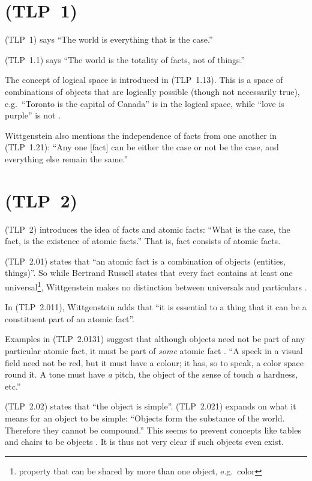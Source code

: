 \documentclass{article}
\newcommand{\prop}[1]{(TLP~#1)}
\begin{document}
\section*{\prop{1}}

\prop{1} says ``The world is everything that is the case.''

\prop{1.1} says ``The world is the totality of facts, not of things.''

The concept of logical space is introduced in \prop{1.13}. This is a space of combinations of objects that are logically possible (though not necessarily true), e.g.\ ``Toronto is the capital of Canada'' is in the logical space, while ``love is purple'' is not \cite{Vi2019}.

Wittgenstein also mentions the independence of facts from one another in \prop{1.21}: ``Any one [fact] can be either the case or not be the case, and everything else remain the same.''

\section*{\prop{2}}

\prop{2} introduces the idea of facts and atomic facts: ``What is the case, the fact, is the existence of atomic facts.''
That is, fact consists of atomic facts.

\prop{2.01} states that ``an atomic fact is a combination of objects (entities, things)''.
So while Bertrand Russell states that every fact contains at least one universal\footnote{property that can be shared by more than one object, e.g.\ color}, Wittgenstein makes no distinction between universals and particulars \cite{Sp2007}.

In \prop{2.011}, Wittgenstein adds that ``it is essential to a thing that it can be a constituent part of an atomic fact''.

Examples in \prop{2.0131} suggest that although objects need not be part of any particular atomic fact, it must be part of \emph{some} atomic fact \cite{Sp}.
``A speck in a visual field need not be red, but it must have a colour; it has, so to speak, a color space round it.
A tone must have \emph{a} pitch, the object of the sense of touch \emph{a} hardness, etc.''

\prop{2.02} states that ``the object is simple''.
\prop{2.021} expands on what it means for an object to be simple: ``Objects form the substance of the world. Therefore they cannot be compound.''
This seems to prevent concepts like tables and chairs to be objects \cite{Vi2019}.
It is thus not very clear if such objects even exist.
\end{document}
